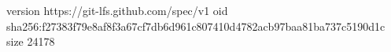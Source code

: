 version https://git-lfs.github.com/spec/v1
oid sha256:f27383f79e8af8f3a67cf7db6d961c807410d4782acb97baa81ba737c5190d1c
size 24178

